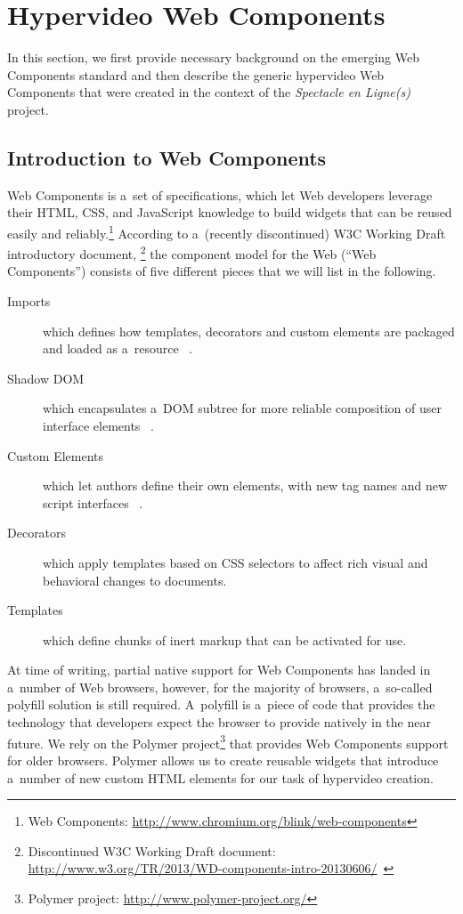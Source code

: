 \documentclass[runningheads,a4paper]{llncs}
\begin{document}
\section{Hypervideo Web Components}
\label{sec:hypervideo-web-components}

In this section, we first provide necessary background on the emerging Web Components standard
and then describe the generic hypervideo Web Components
that were created in the context of the \emph{Spectacle en Ligne(s)} project.

\subsection{Introduction to Web Components}

Web Components is a~set of specifications, which let Web developers leverage
their HTML, CSS, and JavaScript knowledge to build widgets
that can be reused easily and reliably.\footnote{Web Components:
\url{http://www.chromium.org/blink/web-components}}
According to a~(recently discontinued) W3C Working Draft introductory document,%
\footnote{Discontinued W3C Working Draft document:
\url{http://www.w3.org/TR/2013/WD-components-intro-20130606/}~\cite{cooney2013webcomponents}}
the component model for the Web (``Web Components'') consists of five different pieces
that we will list in the following.

\begin{description}
  \item[Imports] which defines how templates, decorators and custom elements are packaged and loaded as a~resource%
  ~\cite{glazkov2014htmlimports}.
  \item[Shadow DOM] which encapsulates a~DOM subtree for more reliable composition of user interface elements%
  ~\cite{glazkov2014shadowdom}.    
  \item[Custom Elements] which let authors define their own elements, with new tag names and new script interfaces%
  ~\cite{glazkov2013customelements}.  
  \item[Decorators] which apply templates based on CSS selectors to affect rich visual and behavioral changes to documents.
  \item[Templates] which define chunks of inert markup that can be activated for use.  
\end{description}

\noindent At time of writing, partial native support for Web Components
has landed in a~number of Web browsers,
however, for the majority of browsers,
a~so-called polyfill solution is still required.
A~polyfill  is a~piece of code that provides the technology
that developers expect the browser to provide natively in the near future.
We rely on the Polymer project\footnote{Polymer project:
\url{http://www.polymer-project.org/}}
that provides Web Components support for older browsers.
Polymer allows us to create reusable widgets that introduce a~number of new
custom HTML elements for our task of hypervideo creation.
\end{document}

